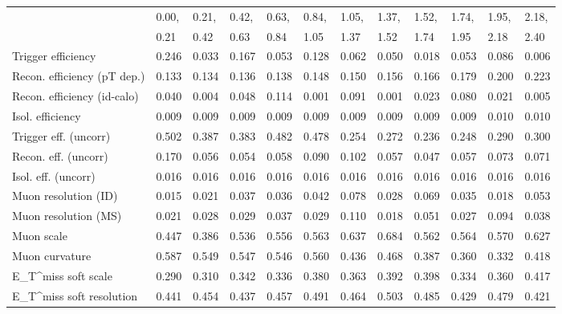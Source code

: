 \begin{tabular}{l|p{0.6cm}p{0.6cm}p{0.6cm}p{0.6cm}p{0.6cm}p{0.6cm}p{0.6cm}p{0.6cm}p{0.6cm}p{0.6cm}p{0.6cm}}
\hline
   & 0.00, & 0.21, & 0.42, & 0.63, & 0.84, & 1.05, & 1.37, & 1.52, & 1.74, & 1.95, & 2.18,  \\ 
   & 0.21 & 0.42 & 0.63 & 0.84 & 1.05 & 1.37 & 1.52 & 1.74 & 1.95 & 2.18 & 2.40  \\ 
\hline
Trigger efficiency                       & 0.246 & 0.033 & 0.167 & 0.053 & 0.128 & 0.062 & 0.050 & 0.018 & 0.053 & 0.086 & 0.006 \\
Recon. efficiency (pT dep.)              & 0.133 & 0.134 & 0.136 & 0.138 & 0.148 & 0.150 & 0.156 & 0.166 & 0.179 & 0.200 & 0.223 \\
Recon. efficiency (id-calo)              & 0.040 & 0.004 & 0.048 & 0.114 & 0.001 & 0.091 & 0.001 & 0.023 & 0.080 & 0.021 & 0.005 \\
Isol. efficiency                         & 0.009 & 0.009 & 0.009 & 0.009 & 0.009 & 0.009 & 0.009 & 0.009 & 0.009 & 0.010 & 0.010 \\
Trigger eff. (uncorr)                    & 0.502 & 0.387 & 0.383 & 0.482 & 0.478 & 0.254 & 0.272 & 0.236 & 0.248 & 0.290 & 0.300 \\
Recon. eff. (uncorr)                     & 0.170 & 0.056 & 0.054 & 0.058 & 0.090 & 0.102 & 0.057 & 0.047 & 0.057 & 0.073 & 0.071 \\
Isol. eff. (uncorr)                      & 0.016 & 0.016 & 0.016 & 0.016 & 0.016 & 0.016 & 0.016 & 0.016 & 0.016 & 0.016 & 0.016 \\
Muon resolution (ID)                     & 0.015 & 0.021 & 0.037 & 0.036 & 0.042 & 0.078 & 0.028 & 0.069 & 0.035 & 0.018 & 0.053 \\
Muon resolution (MS)                     & 0.021 & 0.028 & 0.029 & 0.037 & 0.029 & 0.110 & 0.018 & 0.051 & 0.027 & 0.094 & 0.038 \\
Muon scale                               & 0.447 & 0.386 & 0.536 & 0.556 & 0.563 & 0.637 & 0.684 & 0.562 & 0.564 & 0.570 & 0.627 \\
Muon curvature                           & 0.587 & 0.549 & 0.547 & 0.546 & 0.560 & 0.436 & 0.468 & 0.387 & 0.360 & 0.332 & 0.418 \\
E_{T}^{miss} soft scale                  & 0.290 & 0.310 & 0.342 & 0.336 & 0.380 & 0.363 & 0.392 & 0.398 & 0.334 & 0.360 & 0.417 \\
E_{T}^{miss} soft resolution             & 0.441 & 0.454 & 0.437 & 0.457 & 0.491 & 0.464 & 0.503 & 0.485 & 0.429 & 0.479 & 0.421 \\

\end{tabular}
